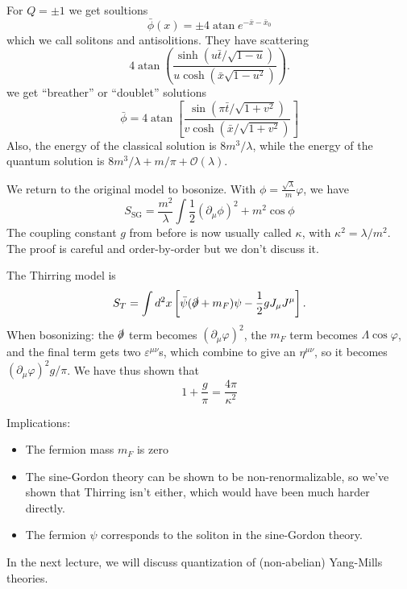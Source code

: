 For $Q = \pm 1$ we get soultions
\[
\bar \phi (x) = \pm 4 \operatorname{atan} e^{-\bar x - \bar x_0}
\]
which we call solitons and antisolitions.
They have scattering
\[
4 \operatorname{atan} \left( \frac{\sinh(u \bar t/ \sqrt{1-u}) }{u \cosh(\bar x \sqrt{1-u^2}) } \right).
\]
 we get ``breather'' or ``doublet'' solutions
\[
\bar \phi = 4 \operatorname{atan}\left[ \frac{\sin(\pi \bar t/\sqrt{1+v^2})}{v \cosh (\bar x /\sqrt{1+v^2})}\right]
\]
Also, the energy of the classical solution is $8m^3/\lambda$, while the energy of the quantum solution is $8m^3/\lambda + m/\pi + \mathcal{O}(\lambda).$ 

We return to the original model to bosonize. With $\phi = \frac{\sqrt{\lambda}}{m} \varphi$, we have
\[
S_{\text{SG}} = \frac{m^2}{\lambda} \int \frac{1}{2} (\partial_\mu \phi)^2 + m^2 \cos \phi
\]
The coupling constant $g$ from before is now usually called $\kappa$, with $\kappa^2 = \lambda/m^2$.
The proof  is careful and order-by-order but we don't discuss it.

The Thirring model is
\[
S_T = \int d^2 x \left[\bar \psi (\slashed \partial + m_F) \psi - \frac{1}{2} g J_\mu J^\mu \right].
\]
When bosonizing: the $\slashed \partial$ term becomes $(\partial_\mu \varphi)^2$, the $m_F$ term becomes $\Lambda \cos \varphi$, and the final term gets two $\varepsilon^{\mu \nu}$s, which combine to give an $\eta^{\mu \nu}$, so it becomes $(\partial_\mu \varphi)^2 g / \pi$.
We have thus shown that
\[
1 + \frac{g}{\pi} = \frac{4\pi}{\kappa^2}
\]

Implications:
\begin{itemize}
    \item The fermion mass $m_F$ is zero 
    \item The sine-Gordon theory can be shown to be non-renormalizable, so we've shown that Thirring isn't either, which would have been much harder directly.
    \item The fermion $\psi$ corresponds to the soliton in the sine-Gordon theory.
\end{itemize}

In the next lecture, we will discuss quantization of (non-abelian) Yang-Mills theories.
